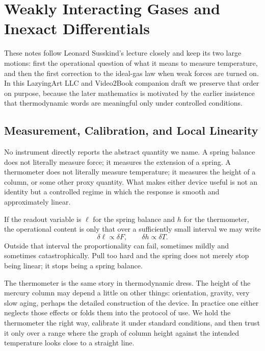 \chapter{Weakly Interacting Gases and Inexact Differentials}

These notes follow Leonard Susskind's lecture closely and keep its two large motions: first the operational question of what it means to measure temperature, and then the first correction to the ideal-gas law when weak forces are turned on. In this LazyingArt LLC and Video2Book companion draft we preserve that order on purpose, because the later mathematics is motivated by the earlier insistence that thermodynamic words are meaningful only under controlled conditions.

\section{Measurement, Calibration, and Local Linearity}

No instrument directly reports the abstract quantity we name. A spring balance does not literally measure force; it measures the extension of a spring. A thermometer does not literally measure temperature; it measures the height of a column, or some other proxy quantity. What makes either device useful is not an identity but a controlled regime in which the response is smooth and approximately linear.

If the readout variable is \(\ell\) for the spring balance and \(h\) for the thermometer, the operational content is only that over a sufficiently small interval we may write
\begin{equation}
\delta \ell \propto \delta F,
\qquad
\delta h \propto \delta T.
\end{equation}
Outside that interval the proportionality can fail, sometimes mildly and sometimes catastrophically. Pull too hard and the spring does not merely stop being linear; it stops being a spring balance.

The thermometer is the same story in thermodynamic dress. The height of the mercury column may depend a little on other things: orientation, gravity, very slow aging, perhaps the detailed construction of the device. In practice one either neglects those effects or folds them into the protocol of use. We hold the thermometer the right way, calibrate it under standard conditions, and then trust it only over a range where the graph of column height against the intended temperature looks close to a straight line.

